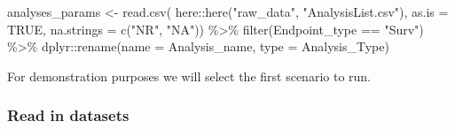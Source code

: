 \documentclass[
]{article}
\newenvironment{Shaded}{\begin{snugshade}}{\end{snugshade}}
\newcommand{\AttributeTok}[1]{\textcolor[rgb]{0.77,0.63,0.00}{#1}}
\newcommand{\CommentTok}[1]{\textcolor[rgb]{0.56,0.35,0.01}{\textit{#1}}}
\newcommand{\ConstantTok}[1]{\textcolor[rgb]{0.00,0.00,0.00}{#1}}
\newcommand{\DecValTok}[1]{\textcolor[rgb]{0.00,0.00,0.81}{#1}}
\newcommand{\FunctionTok}[1]{\textcolor[rgb]{0.00,0.00,0.00}{#1}}
\newcommand{\NormalTok}[1]{#1}
\newcommand{\OtherTok}[1]{\textcolor[rgb]{0.56,0.35,0.01}{#1}}
\newcommand{\SpecialCharTok}[1]{\textcolor[rgb]{0.00,0.00,0.00}{#1}}
\newcommand{\StringTok}[1]{\textcolor[rgb]{0.31,0.60,0.02}{#1}}
\begin{document}
\begin{Shaded}
\begin{Highlighting}[]
\NormalTok{analyses\_params }\OtherTok{\textless{}{-}}
  \FunctionTok{read.csv}\NormalTok{(}
\NormalTok{    here}\SpecialCharTok{::}\FunctionTok{here}\NormalTok{(}\StringTok{"raw\_data"}\NormalTok{, }\StringTok{"AnalysisList.csv"}\NormalTok{),}
    \AttributeTok{as.is =} \ConstantTok{TRUE}\NormalTok{,}
    \AttributeTok{na.strings =} \FunctionTok{c}\NormalTok{(}\StringTok{"NR"}\NormalTok{, }\StringTok{"NA"}\NormalTok{)) }\SpecialCharTok{\%\textgreater{}\%} 
  \FunctionTok{filter}\NormalTok{(Endpoint\_type }\SpecialCharTok{==} \StringTok{"Surv"}\NormalTok{) }\SpecialCharTok{\%\textgreater{}\%} 
\NormalTok{  dplyr}\SpecialCharTok{::}\FunctionTok{rename}\NormalTok{(}\AttributeTok{name =}\NormalTok{ Analysis\_name,}
                \AttributeTok{type =}\NormalTok{ Analysis\_Type)}
\end{Highlighting}
\end{Shaded}

For demonstration purposes we will select the first scenario to run.

\begin{Shaded}
\end{Shaded}

\hypertarget{read-in-datasets}{%
\subsubsection{Read in datasets}\label{read-in-datasets}}
\end{document}
